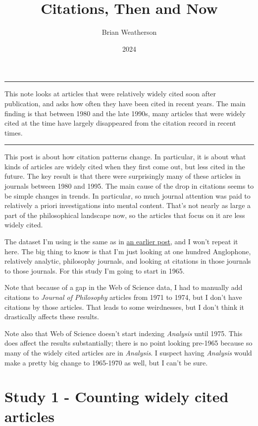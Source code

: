 \documentclass[
  10pt,
  letterpaper,
  DIV=11,
  numbers=noendperiod,
  twoside]{scrartcl}
\title{Citations, Then and Now}
\author{Brian Weatherson}
\date{2024}
\renewenvironment{abstract}
 {\vspace{-1.25cm}
 \quotation\small\noindent\rule{\linewidth}{.5pt}\par\smallskip
 \noindent }
 {\par\noindent\rule{\linewidth}{.5pt}\endquotation}
\begin{document}
\maketitle
\begin{abstract}
This note looks at articles that were relatively widely cited soon after
publication, and asks how often they have been cited in recent years.
The main finding is that between 1980 and the late 1990s, many articles
that were widely cited at the time have largely disappeared from the
citation record in recent times.
\end{abstract}


This post is about how citation patterns change. In particular, it is
about what kinds of articles are widely cited when they first come out,
but less cited in the future. The key result is that there were
surprisingly many of these articles in journals between 1980 and 1995.
The main cause of the drop in citations seems to be simple changes in
trends. In particular, so much journal attention was paid to relatively
a priori investigations into mental content. That's not nearly as large
a part of the philosophical landscape now, so the articles that focus on
it are less widely cited.

The dataset I'm using is the same as in
\href{http://brian.weatherson.org/quarto/posts/citations-raw-data/citations.html}{an
earlier post}, and I won't repeat it here. The big thing to know is that
I'm just looking at one hundred Anglophone, relatively analytic,
philosophy journals, and looking at citations in those journals to those
journals. For this study I'm going to start in 1965.

Note that because of a gap in the Web of Science data, I had to manually
add citations to \emph{Journal of Philosophy} articles from 1971 to
1974, but I don't have citations by those articles. That leads to some
weirdnesses, but I don't think it drastically affects these results.

Note also that Web of Science doesn't start indexing \emph{Analysis}
until 1975. This does affect the results substantially; there is no
point looking pre-1965 because so many of the widely cited articles are
in \emph{Analysis}. I suspect having \emph{Analysis} would make a pretty
big change to 1965-1970 as well, but I can't be sure.

\section{Study 1 - Counting widely cited articles}\label{sec-study-one}
\end{document}
